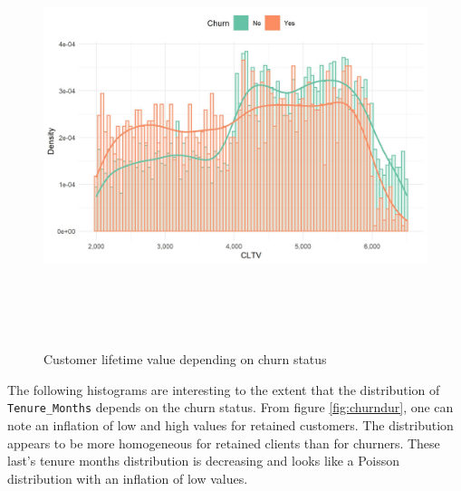 \documentclass[
]{book}
\begin{document}
\begin{figure}

{\centering \includegraphics[width=450pt,height=350pt]{./imgs/cltv_churn_plot} 

}

\caption{Customer lifetime value depending on churn status}\label{fig:cltvchurn}
\end{figure}

The following histograms are interesting to the extent that the distribution of \texttt{Tenure\_Months} depends on the churn status. From figure \ref{fig:churndur}, one can note an inflation of low and high values for retained customers. The distribution appears to be more homogeneous for retained clients than for churners. These last's tenure months distribution is decreasing and looks like a Poisson distribution with an inflation of low values.
\end{document}

